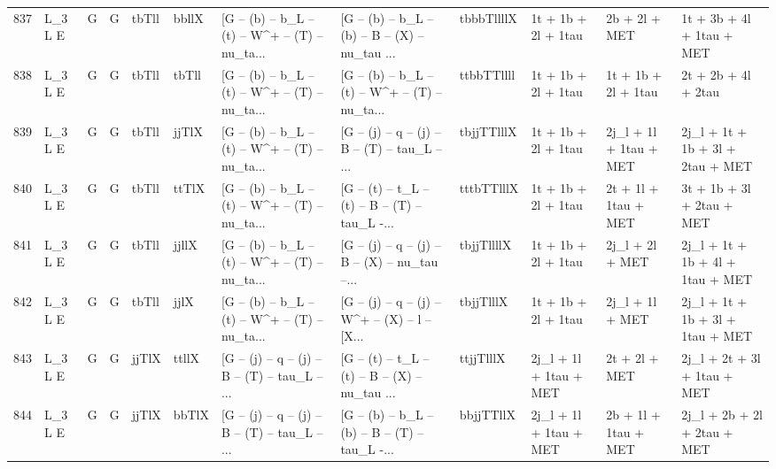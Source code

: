 \begin{tabular}{llllllllllll}
837  &      L\_3 L E &     G &     G &       tbTll &       bbllX &  [G -- (b) -- b\_L -- (t) -- W\textasciicircum + -- (T) -- nu\_ta... &  [G -- (b) -- b\_L -- (b) -- B -- (X) -- nu\_tau ... &  tbbbTllllX &      1t + 1b + 2l + 1tau &            2b + 2l + MET &          1t + 3b + 4l + 1tau + MET \\
838  &      L\_3 L E &     G &     G &       tbTll &       tbTll &  [G -- (b) -- b\_L -- (t) -- W\textasciicircum + -- (T) -- nu\_ta... &  [G -- (b) -- b\_L -- (t) -- W\textasciicircum + -- (T) -- nu\_ta... &  ttbbTTllll &      1t + 1b + 2l + 1tau &      1t + 1b + 2l + 1tau &                2t + 2b + 4l + 2tau \\
839  &      L\_3 L E &     G &     G &       tbTll &       jjTlX &  [G -- (b) -- b\_L -- (t) -- W\textasciicircum + -- (T) -- nu\_ta... &  [G -- (j) -- q -- (j) -- B -- (T) -- tau\_L -- ... &  tbjjTTlllX &      1t + 1b + 2l + 1tau &   2j\_l + 1l + 1tau + MET &   2j\_l + 1t + 1b + 3l + 2tau + MET \\
840  &      L\_3 L E &     G &     G &       tbTll &       ttTlX &  [G -- (b) -- b\_L -- (t) -- W\textasciicircum + -- (T) -- nu\_ta... &  [G -- (t) -- t\_L -- (t) -- B -- (T) -- tau\_L -... &  tttbTTlllX &      1t + 1b + 2l + 1tau &     2t + 1l + 1tau + MET &          3t + 1b + 3l + 2tau + MET \\
841  &      L\_3 L E &     G &     G &       tbTll &       jjllX &  [G -- (b) -- b\_L -- (t) -- W\textasciicircum + -- (T) -- nu\_ta... &  [G -- (j) -- q -- (j) -- B -- (X) -- nu\_tau --... &  tbjjTllllX &      1t + 1b + 2l + 1tau &          2j\_l + 2l + MET &   2j\_l + 1t + 1b + 4l + 1tau + MET \\
842  &      L\_3 L E &     G &     G &       tbTll &        jjlX &  [G -- (b) -- b\_L -- (t) -- W\textasciicircum + -- (T) -- nu\_ta... &  [G -- (j) -- q -- (j) -- W\textasciicircum + -- (X) -- l -- [X... &   tbjjTlllX &      1t + 1b + 2l + 1tau &          2j\_l + 1l + MET &   2j\_l + 1t + 1b + 3l + 1tau + MET \\
843  &      L\_3 L E &     G &     G &       jjTlX &       ttllX &  [G -- (j) -- q -- (j) -- B -- (T) -- tau\_L -- ... &  [G -- (t) -- t\_L -- (t) -- B -- (X) -- nu\_tau ... &   ttjjTlllX &   2j\_l + 1l + 1tau + MET &            2t + 2l + MET &        2j\_l + 2t + 3l + 1tau + MET \\
844  &      L\_3 L E &     G &     G &       jjTlX &       bbTlX &  [G -- (j) -- q -- (j) -- B -- (T) -- tau\_L -- ... &  [G -- (b) -- b\_L -- (b) -- B -- (T) -- tau\_L -... &   bbjjTTllX &   2j\_l + 1l + 1tau + MET &     2b + 1l + 1tau + MET &        2j\_l + 2b + 2l + 2tau + MET \\

\end{tabular}

